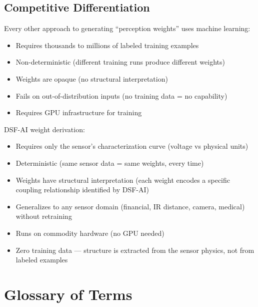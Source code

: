 \documentclass[11pt,a4paper]{article}
\begin{document}
\subsection{Competitive Differentiation}

Every other approach to generating ``perception weights'' uses machine learning:
\begin{itemize}
    \item Requires thousands to millions of labeled training examples
    \item Non-deterministic (different training runs produce different weights)
    \item Weights are opaque (no structural interpretation)
    \item Fails on out-of-distribution inputs (no training data = no capability)
    \item Requires GPU infrastructure for training
\end{itemize}

DSF-AI weight derivation:
\begin{itemize}
    \item Requires only the sensor's characterization curve (voltage vs physical units)
    \item Deterministic (same sensor data = same weights, every time)
    \item Weights have structural interpretation (each weight encodes a specific coupling relationship identified by DSF-AI)
    \item Generalizes to any sensor domain (financial, IR distance, camera, medical) without retraining
    \item Runs on commodity hardware (no GPU needed)
    \item Zero training data --- structure is extracted from the sensor physics, not from labeled examples
\end{itemize}

\section{Glossary of Terms}
\end{document}
